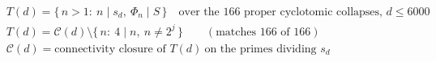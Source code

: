 \documentclass{article}
\begin{document}
\[
\begin{aligned}
&T(d)=\{\,n>1:\ n\mid s_d,\ \Phi_n\mid S\,\}\quad\text{over the 166 proper cyclotomic collapses, }d\le6000\\
&T(d)=\mathcal{C}(d)\setminus\{\,n:\ 4\mid n,\ n\neq2^{j}\,\}\qquad(\text{matches 166 of 166})\\
&\mathcal{C}(d)=\text{connectivity closure of }T(d)\ \text{on the primes dividing }s_d
\end{aligned}
\]
\end{document}
